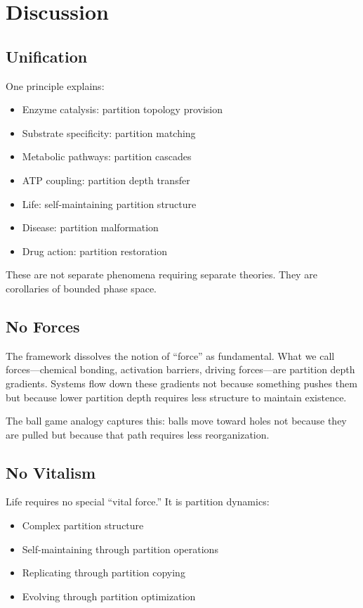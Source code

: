 \documentclass[twocolumn,10pt,a4paper]{article}
\theoremstyle{definition}
\theoremstyle{remark}
\begin{document}
\section{Discussion}
\label{sec:discussion}

\subsection{Unification}

One principle explains:
\begin{itemize}
    \item Enzyme catalysis: partition topology provision
    \item Substrate specificity: partition matching
    \item Metabolic pathways: partition cascades
    \item ATP coupling: partition depth transfer
    \item Life: self-maintaining partition structure
    \item Disease: partition malformation
    \item Drug action: partition restoration
\end{itemize}

These are not separate phenomena requiring separate theories. They are corollaries of bounded phase space.

\subsection{No Forces}

The framework dissolves the notion of ``force'' as fundamental. What we call forces---chemical bonding, activation barriers, driving forces---are partition depth gradients. Systems flow down these gradients not because something pushes them but because lower partition depth requires less structure to maintain existence.

The ball game analogy captures this: balls move toward holes not because they are pulled but because that path requires less reorganization.

\subsection{No Vitalism}

Life requires no special ``vital force.'' It is partition dynamics:
\begin{itemize}
    \item Complex partition structure
    \item Self-maintaining through partition operations
    \item Replicating through partition copying
    \item Evolving through partition optimization
\end{itemize}
\end{document}
